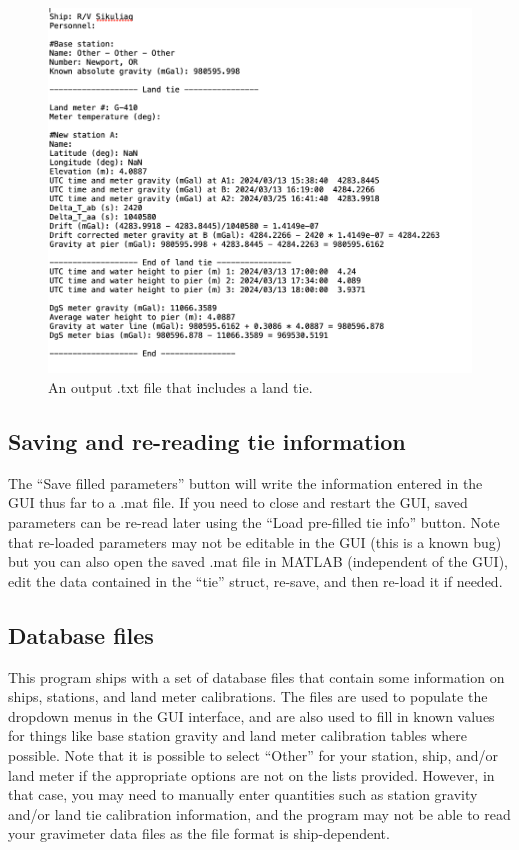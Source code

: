 \documentclass{pfpe-manual}
\begin{document}
\begin{figure}[ht!]
\centering
\includegraphics[width=\textwidth]{figs/land_tie_report.png}
\caption{An output .txt file that includes a land tie.}
\label{rep:landtie}
\end{figure}




\subsection{Saving and re-reading tie information}
\label{save-re}
The ``Save filled parameters'' button will write the information entered in the GUI thus far to a .mat file. If you need to close and restart the GUI, saved parameters can be re-read later using the ``Load pre-filled tie info'' button. Note that re-loaded parameters may not be editable in the GUI (this is a known bug) but you can also open the saved .mat file in MATLAB (independent of the GUI), edit the data contained in the ``tie'' struct, re-save, and then re-load it if needed.


\subsection{Database files}
\label{datab}

This program ships with a set of database files that contain some information on ships, stations, and land meter calibrations. The files are used to populate the dropdown menus in the GUI interface, and are also used to fill in known values for things like base station gravity and land meter calibration tables where possible. Note that it is possible to select ``Other'' for your station, ship, and/or land meter if the appropriate options are not on the lists provided. However, in that case, you may need to manually enter quantities such as station gravity and/or land tie calibration information, and the program may not be able to read your gravimeter data files as the file format is ship-dependent.
\end{document}
